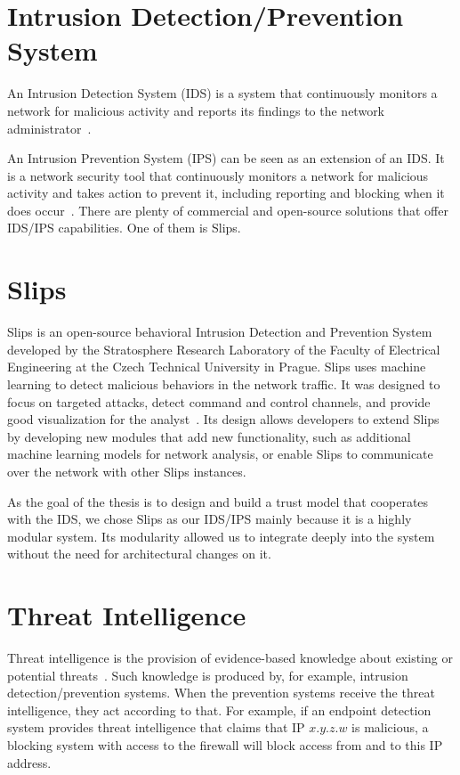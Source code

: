 \section{Intrusion Detection/Prevention System}
\label{sec:intrusion-detection-prevention-system}
An Intrusion Detection System (IDS) is a system that continuously monitors a network for malicious activity and reports its findings to the network administrator~\cite{bace2001intrusion}.

An Intrusion Prevention System (IPS) can be seen as an extension of an IDS. 
It is a network security tool that continuously monitors a network for malicious activity and takes action to prevent it, including reporting and blocking when it does occur~\cite{zhang2004intrusion}.
There are plenty of commercial and open-source solutions that offer IDS/IPS capabilities. One of them is Slips.


\section{Slips}
\label{sec:slips}
Slips is an open-source behavioral Intrusion Detection and Prevention System developed by the Stratosphere Research Laboratory of the Faculty of Electrical Engineering at the Czech Technical University in Prague.
Slips uses machine learning to detect malicious behaviors in the network traffic. It was designed to focus on targeted attacks, detect command and control channels, and provide good visualization for the analyst~\cite{slips}.
Its design allows developers to extend Slips by developing new modules that add new functionality, such as additional machine learning models for network analysis, or enable Slips to communicate over the network with other Slips instances.

As the goal of the thesis is to design and build a trust model that cooperates with the IDS, we chose Slips as our IDS/IPS mainly because it is a highly modular system.
Its modularity allowed us to integrate deeply into the system without the need for architectural changes on it.

\section{Threat Intelligence}
\label{sec:threat-intelligence}
Threat intelligence is the provision of evidence-based knowledge about existing or potential threats~\cite{threatintelligence}.
Such knowledge is produced by, for example, intrusion detection/prevention systems.
When the prevention systems receive the threat intelligence, they act according to that.
For example, if an endpoint detection system provides threat intelligence that claims that IP $x.y.z.w$ is malicious, a blocking system with access to the firewall will block access from and to this IP address.

